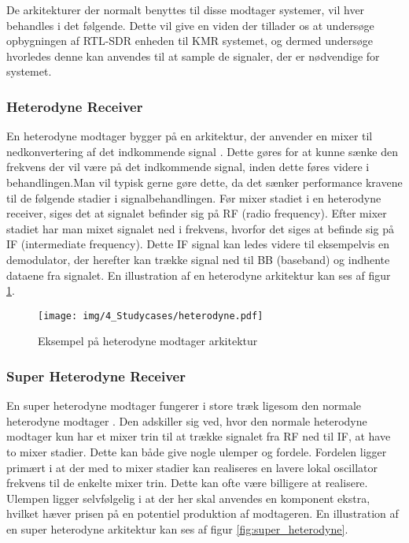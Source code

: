 \begin{appendices}
De arkitekturer der normalt benyttes til disse modtager systemer, vil hver behandles i det følgende. Dette vil give en viden der tillader os at undersøge opbygningen af RTL-SDR enheden til KMR systemet, og dermed undersøge hvorledes denne kan anvendes til at sample de signaler, der er nødvendige for systemet.

\subsubsection{Heterodyne Receiver}
En heterodyne modtager bygger på en arkitektur, der anvender en mixer til nedkonvertering af det indkommende signal \cite{receiver-architecture}. Dette gøres for at kunne sænke den frekvens der vil være på det indkommende signal, inden dette føres videre i behandlingen.Man vil typisk gerne gøre dette, da det sænker performance kravene til de følgende stadier i signalbehandlingen. Før mixer stadiet i en heterodyne receiver, siges det at signalet befinder sig på RF (radio frequency). Efter mixer stadiet har man mixet signalet ned i frekvens, hvorfor det siges at befinde sig på IF (intermediate frequency). Dette IF signal kan ledes videre til eksempelvis en demodulator, der herefter kan trække signal ned til BB (baseband) og indhente dataene fra signalet. En illustration af en heterodyne arkitektur kan ses af figur \ref{fig:heterodyne}.

\begin{figure}[H]
	\centering{}
	\texttt{[image: img/4\_Studycases/heterodyne.pdf]}
	\caption{Eksempel på heterodyne modtager arkitektur}
	\label{fig:heterodyne}
\end{figure} 

\pagebreak
\subsubsection{Super Heterodyne Receiver}
En super heterodyne modtager fungerer i store træk ligesom den normale heterodyne modtager \cite{receiver-architecture}. Den adskiller sig ved, hvor den normale heterodyne modtager kun har et mixer trin til at trække signalet fra RF ned til IF, at have to mixer stadier. Dette kan både give nogle ulemper og fordele. Fordelen ligger primært i at der med to mixer stadier kan realiseres en lavere lokal oscillator frekvens til de enkelte mixer trin. Dette kan ofte være billigere at realisere. Ulempen ligger selvfølgelig i at der her skal anvendes en komponent ekstra, hvilket hæver prisen på en potentiel produktion af modtageren. En illustration af en super heterodyne arkitektur kan ses af figur \ref{fig:super_heterodyne}.


\end{appendices}
